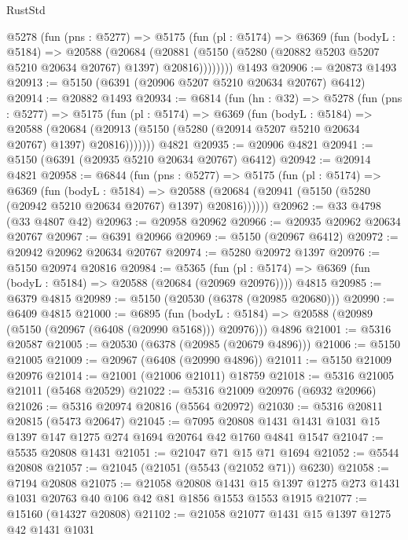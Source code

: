 \begin{lexlean}{RustStd}
\begin{coremodule}
      @5278
        (fun (pns : @5277) =>
        @5175
          (fun (pl : @5174) =>
          @6369
            (fun (bodyL : @5184) =>
            @20588
              (@20684
                (@20881 (@5150 (@5280 (@20882 @5203 @5207 @5210 @20634 @20767) @1397) @20816))))))))
    @1493
@20906 := @20873 @1493
@20913 := @5150 (@6391 (@20906 @5207 @5210 @20634 @20767) @6412)
@20914 := @20882 @1493
@20934 := @6814
    (fun (hn : @32) =>
    @5278
      (fun (pns : @5277) =>
      @5175
        (fun (pl : @5174) =>
        @6369
          (fun (bodyL : @5184) =>
          @20588
            (@20684 (@20913 (@5150 (@5280 (@20914 @5207 @5210 @20634 @20767) @1397) @20816)))))))
    @4821
@20935 := @20906 @4821
@20941 := @5150 (@6391 (@20935 @5210 @20634 @20767) @6412)
@20942 := @20914 @4821
@20958 := @6844
    (fun (pns : @5277) =>
    @5175
      (fun (pl : @5174) =>
      @6369
        (fun (bodyL : @5184) =>
        @20588 (@20684 (@20941 (@5150 (@5280 (@20942 @5210 @20634 @20767) @1397) @20816))))))
@20962 := @33 @4798 (@33 @4807 @42)
@20963 := @20958 @20962
@20966 := @20935 @20962 @20634 @20767
@20967 := @6391 @20966
@20969 := @5150 (@20967 @6412)
@20972 := @20942 @20962 @20634 @20767
@20974 := @5280 @20972 @1397
@20976 := @5150 @20974 @20816
@20984 := @5365
    (fun (pl : @5174) => @6369 (fun (bodyL : @5184) => @20588 (@20684 (@20969 @20976))))
    @4815
@20985 := @6379 @4815
@20989 := @5150 (@20530 (@6378 (@20985 @20680)))
@20990 := @6409 @4815
@21000 := @6895
    (fun (bodyL : @5184) => @20588 (@20989 (@5150 (@20967 (@6408 (@20990 @5168))) @20976)))
    @4896
@21001 := @5316 @20587
@21005 := @20530 (@6378 (@20985 (@20679 @4896)))
@21006 := @5150 @21005
@21009 := @20967 (@6408 (@20990 @4896))
@21011 := @5150 @21009 @20976
@21014 := @21001 (@21006 @21011) @18759
@21018 := @5316 @21005 @21011 (@5468 @20529)
@21022 := @5316 @21009 @20976 (@6932 @20966)
@21026 := @5316 @20974 @20816 (@5564 @20972)
@21030 := @5316 @20811 @20815 (@5473 @20647)
@21045 := @7095
    @20808
    @1431
    @1431
    @1031
    @15
    @1397
    @147
    @1275
    @274
    @1694
    @20764
    @42
    @1760
    @4841
    @1547
@21047 := @5535 @20808 @1431
@21051 := @21047 @71 @15 @71 @1694
@21052 := @5544 @20808
@21057 := @21045 (@21051 (@5543 (@21052 @71)) @6230)
@21058 := @7194 @20808
@21075 := @21058
    @20808
    @1431
    @15
    @1397
    @1275
    @273
    @1431
    @1031
    @20763
    @40
    @106
    @42
    @81
    @1856
    @1553
    @1553
    @1915
@21077 := @15160 (@14327 @20808)
@21102 := @21058
    @21077
    @1431
    @15
    @1397
    @1275
    @42
    @1431
    @1031

\end{coremodule}
\end{lexlean}
